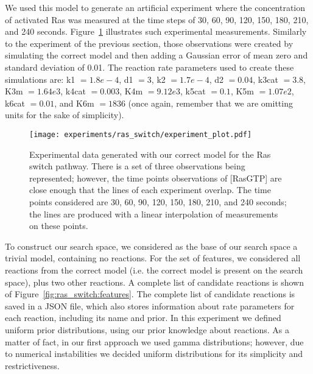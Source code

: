 We used this model to generate an artificial experiment where the
concentration of activated Ras was measured at the time steps of 30,
60, 90, 120, 150, 180, 210, and 240 seconds.
Figure~\ref{fig:ras_switch:experimental_observations} illustrates
such experimental measurements. Similarly to the experiment of the 
previous section, those observations were created by simulating the 
correct model and then adding a Gaussian error of mean zero and standard
deviation of 0.01. The reaction rate parameters used to create these
simulations are: k1 $= 1.8e-4$, d1 $= 3$, k2 $= 1.7e-4$, d2 $=0.04$,
k3cat $= 3.8$, K3m $=1.64e3$, k4cat $= 0.003$, K4m $= 9.12e3$, k5cat
$= 0.1$, K5m $= 1.07e2$, k6cat $= 0.01$, and K6m $=1836$ (once again,
remember that we are omitting units for the sake of simplicity).

\begin{figure}[H]
\begin{center}
\texttt{[image: experiments/ras\_switch/experiment\_plot.pdf]}
\caption{Experimental data generated with our correct model for the Ras
    switch pathway. There is a set of three observations being
    represented; however, the time points observations of [RasGTP] are
    close enough that the lines of each experiment overlap. The time
    points considered are 30, 60, 90, 120, 150, 180, 210, and 240
    seconds; the lines are produced with a linear interpolation of
    measurements on these points.}
\label{fig:ras_switch:experimental_observations}
\end{center}
\end{figure}

To construct our search space, we considered as the base of our search
space a trivial model, containing no reactions. For the set of features,
we considered all reactions from the correct model (i.e. the correct
model is present on the search space), plus two other reactions. A
complete list of candidate reactions is shown of
Figure~\ref{fig:ras_switch:features}. The complete list of candidate
reactions is saved in a JSON file, which also stores information about
rate parameters for each reaction, including its name and prior. In this
experiment we defined uniform prior distributions, using our prior
knowledge about reactions. As a matter of fact, in our first approach we
used gamma distributions; however, due to numerical instabilities we
decided uniform distributions for its simplicity and restrictiveness.

